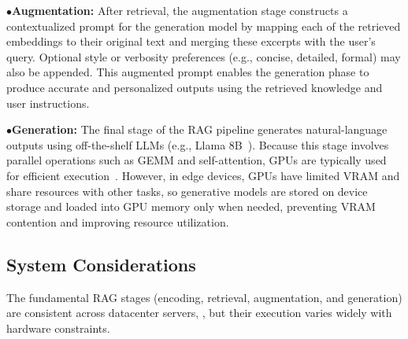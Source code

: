 \noindent$\bullet$\textbf{Augmentation:}
\label{sec:BG:Augmentation}
After retrieval, the augmentation stage constructs a contextualized prompt for the generation model by mapping each of the \topk{} retrieved embeddings to their original text and merging these excerpts with the user’s query. Optional style or verbosity preferences (e.g., concise, detailed, formal) may also be appended. This augmented prompt enables the generation phase to produce accurate and personalized outputs using the retrieved knowledge and user instructions.

\noindent$\bullet$\textbf{Generation:}
\label{sec:BG:Generation}
The final stage of the RAG pipeline generates natural-language outputs using off-the-shelf LLMs (e.g., Llama 8B~\cite{llama_3_1_8b_instruct}). Because this stage involves parallel operations such as GEMM and self-attention, GPUs are typically used for efficient execution~\cite{attention_gpu}. However, in edge devices, GPUs have limited VRAM and share resources with other tasks, so generative models are stored on device storage and loaded into GPU memory only when needed, preventing VRAM contention and improving resource utilization. 

\subsection{System Considerations}
\label{sec:classical_pipeline}
The fundamental RAG stages (encoding, retrieval, augmentation, and generation) are consistent across datacenter servers, , but their execution varies widely with hardware constraints.

